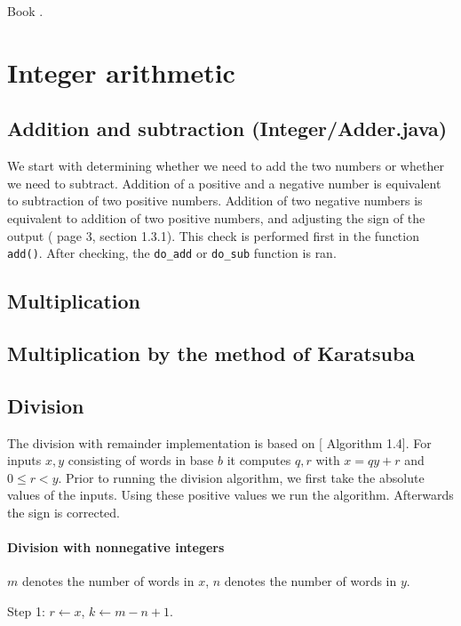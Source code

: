 \documentclass[a4paper]{article}
\begin{document}
Book \cite{ant}.

\section{Integer arithmetic}

\subsection{Addition and subtraction (Integer/Adder.java)}

We start with determining whether we need to add the two numbers or whether we need to subtract.
Addition of a positive and a negative number is equivalent to subtraction of two positive numbers.
Addition of two negative numbers is equivalent to addition of two positive numbers, and adjusting the sign of the output
(\cite{ant} page 3, section 1.3.1).
This check is performed first in the function \texttt{add()}.
After checking, the \texttt{do\_add} or \texttt{do\_sub} function is ran.

\subsection{Multiplication}




\subsection{Multiplication by the method of Karatsuba}

\subsection{Division}

The division with remainder implementation is based on [\cite{ant} Algorithm 1.4].
For inputs $x, y$ consisting of words in base $b$ it computes $q, r$ with $x=qy+r$ and $0 \le r < y$.
Prior to running the division algorithm, we first take the absolute values of the inputs.
Using these positive values we run the algorithm.
Afterwards the sign is corrected.

\paragraph{Division with nonnegative integers}
$m$ denotes the number of words in $x$, $n$ denotes the number of words in $y$.

Step 1: $r \gets x$, $k \gets m - n + 1$.
\end{document}
